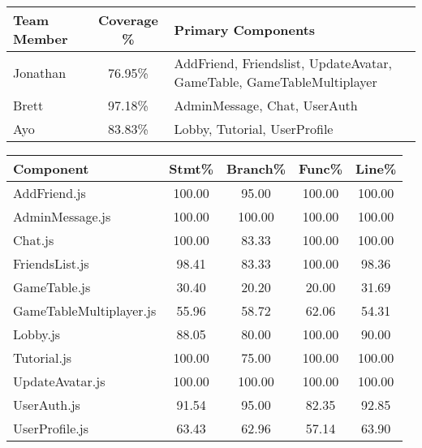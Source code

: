 \begin{minipage}{\textwidth}
\begin{center}
\vspace{1em}
\begin{tabular}{|l|c|p{6cm}|}
\hline
\textbf{Team Member} & \textbf{Coverage \%} & \textbf{Primary Components} \\
\hline
Jonathan & 76.95\% & AddFriend, Friendslist, UpdateAvatar, GameTable, GameTableMultiplayer \\
Brett & 97.18\% & AdminMessage, Chat, UserAuth \\
Ayo & 83.83\% & Lobby, Tutorial, UserProfile \\
\hline
\end{tabular}

\vspace{1em}
\small
\begin{tabular}{|l|c|c|c|c|}
\hline
\textbf{Component} & \textbf{Stmt\%} & \textbf{Branch\%} & \textbf{Func\%} & \textbf{Line\%} \\
\hline
AddFriend.js & 100.00 & 95.00 & 100.00 & 100.00 \\
AdminMessage.js & 100.00 & 100.00 & 100.00 & 100.00 \\
Chat.js & 100.00 & 83.33 & 100.00 & 100.00 \\
FriendsList.js & 98.41 & 83.33 & 100.00 & 98.36 \\
GameTable.js & 30.40 & 20.20 & 20.00 & 31.69 \\
GameTableMultiplayer.js & 55.96 & 58.72 & 62.06 & 54.31 \\
Lobby.js & 88.05 & 80.00 & 100.00 & 90.00 \\
Tutorial.js & 100.00 & 75.00 & 100.00 & 100.00 \\
UpdateAvatar.js & 100.00 & 100.00 & 100.00 & 100.00 \\
UserAuth.js & 91.54 & 95.00 & 82.35 & 92.85 \\
UserProfile.js & 63.43 & 62.96 & 57.14 & 63.90 \\
\hline
\end{tabular}
\end{center}
\end{minipage}